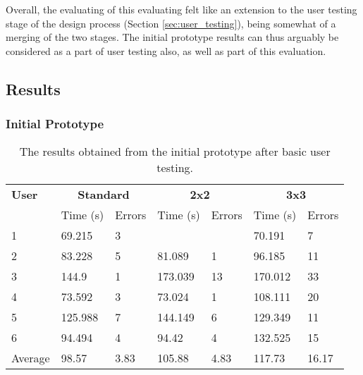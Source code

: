 \documentclass[evaluation.tex]{subfiles}
\begin{document}
Overall, the evaluating of this evaluating felt like an extension to the user
testing stage of the design process (Section \ref{sec:user_testing}), being
somewhat of a merging of the two stages. The initial prototype results can thus
arguably be considered as a part of user testing also, as well as part of this
evaluation.

\subsection{Results} %
\label{sub:results}
\subsubsection{Initial Prototype} %
\label{ssub:initial_prototype}
\begin{table}[H]
	\centering
	\begin{tabular}{| l | l | l | l | l | l | l |}
	 \hline
	 \textbf{User} & \multicolumn{2}{c|}{\textbf{Standard}} &
	 \multicolumn{2}{c|}{\textbf{2x2}} & \multicolumn{2}{c|}{\textbf{3x3}} \\
	 \cline{2-3} \cline{4-5} \cline{6-7}
	  & Time (s) & Errors & Time (s) & Errors & Time (s) & Errors\\
	 \hline
	 1 & 69.215 & 3 &  &  & 70.191 & 7 \\
	 2 & 83.228 & 5 & 81.089 & 1 & 96.185 & 11 \\
	 3 & 144.9 & 1 & 173.039 & 13 & 170.012 & 33 \\
	 4 & 73.592 & 3 & 73.024 & 1 & 108.111 & 20 \\
	 5 & 125.988 & 7 & 144.149 & 6 & 129.349 & 11 \\
	 6 & 94.494 & 4 & 94.42 & 4 & 132.525 & 15 \\
	 \hline
	 Average & 98.57 & 3.83 & 105.88 & 4.83 & 117.73 & 16.17 \\
	 \hline
	\end{tabular}
	\caption{The results obtained from the initial prototype after basic
	user testing.}
\end{table}
\end{document}
